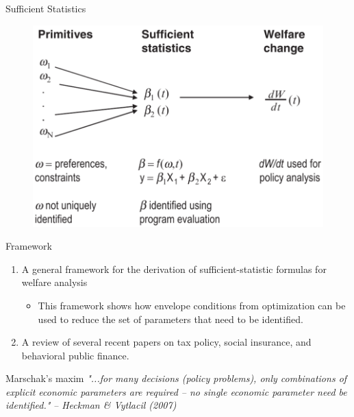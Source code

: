 \documentclass{beamer}
\begin{document}
\begin{frame}{Sufficient Statistics}
	\begin{figure}[h]
		\centering
		\includegraphics[scale=0.7]{figure1.png}
	\end{figure}
\end{frame}
\begin{frame}{Framework}
	\begin{enumerate}
		\item A general framework for the derivation of sufficient-statistic formulas for welfare analysis
		\begin{itemize}
			\item This framework shows how envelope conditions from optimization can be used to reduce the set of parameters that need to be identified.
		\end{itemize}
		\item A review of several recent papers on tax policy, social insurance, and behavioral public finance.
	\end{enumerate}
	\medskip
	\begin{block}{Marschak's maxim}
		\textit{"...for many decisions (policy problems), only combinations of explicit economic parameters are required -- no single economic parameter need be identified."}
		\hfill \textit{-- Heckman \& Vytlacil (2007)}
	\end{block}
\end{frame}
\end{document}
